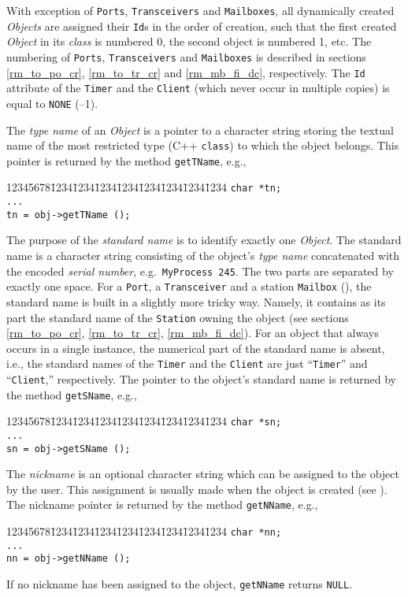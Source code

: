 With exception of {\tt Ports}, {\tt Transceivers} and {\tt Mailboxes},
all dynamically created
{\em Objects\/} are assigned their {\tt Id}s in the order of creation, such
that the first created {\em Object\/} in its {\em class} is numbered 0,
the second object is numbered 1, etc.
The numbering of {\tt Ports}, {\tt Transceivers} and {\tt Mailboxes}
is described in sections \ref{rm_to_po_cr}, \ref{rm_to_tr_cr} and
\ref{rm_mb_fi_dc}, respectively.
The {\tt Id} attribute of
the {\tt Timer} and the {\tt Client} (which never occur in multiple copies)
is equal to {\tt NONE} (--1).

The {\em type name\/} of an {\em Object\/} is a pointer to a character string
storing the textual name of the most restricted
type (C++ {\tt class}) to which the object belongs.
This pointer is returned by the method
{\tt getTName}, e.g.,
{\tt\begin{tabbing}
12345678\=1234\=1234\=1234\=1234\=1234\=1234\=1234\=1234\kill
 \> {\tt char *tn;}\\
 \> {\tt ...}\\
 \> {\tt tn = obj->getTName ();}
\end{tabbing}}

The purpose of the {\em standard name\/} is to identify exactly one
{\em Object}.
The standard name is a character string consisting of the object's
{\em type name\/} concatenated with the encoded {\em serial number}, e.g.\ 
{\tt MyProcess~245}.
The two parts are separated by exactly one space.
For a {\tt Port}, a {\tt Transceiver} and a station {\tt Mailbox}
(\sect{rm_mb_fi_dc}),
the standard name is built in a slightly more tricky way.
Namely, it contains as its part the standard name of the {\tt Station}
owning the object (see sections \ref{rm_to_po_cr}, \ref{rm_to_tr_cr},
\ref{rm_mb_fi_dc}).
For an object that always occurs in a single instance, the numerical part of
the standard name is absent, i.e., the standard names of the {\tt Timer}
and the {\tt Client} are just ``{\tt Timer}'' and ``{\tt Client},''
respectively.
The pointer to the object's standard name is returned by the method
{\tt getSName}, e.g.,
{\tt\begin{tabbing}
12345678\=1234\=1234\=1234\=1234\=1234\=1234\=1234\=1234\kill
 \> {\tt char *sn;}\\
 \> {\tt ...}\\
 \> {\tt sn = obj->getSName ();}
\end{tabbing}}

The {\em nickname\/} is an optional character string which can be assigned to
the object by the user.
This assignment is usually made when the object is created
(see ).
The nickname pointer is returned by the method {\tt getNName}, e.g.,
{\tt\begin{tabbing}
12345678\=1234\=1234\=1234\=1234\=1234\=1234\=1234\=1234\kill
 \> {\tt char *nn;}\\
 \> {\tt ...}\\
 \> {\tt nn = obj->getNName ();}
\end{tabbing}}
\noindent
If no nickname has been assigned to the object, {\tt getNName} returns
{\tt NULL}.

